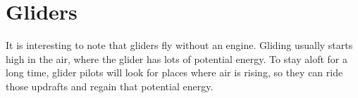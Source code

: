 \section{Gliders}

It is interesting to note that gliders fly without an engine. Gliding usually starts high in the air, where the glider has lots of potential energy. To stay aloft for a long
time, glider pilots will look for places where air is rising, so they can ride those updrafts and regain that potential energy.

